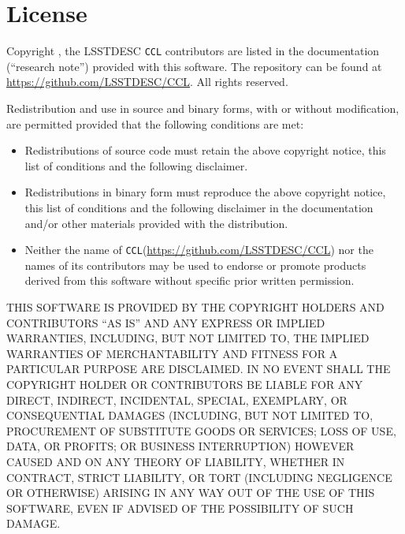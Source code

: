 \documentclass[\docopts]{\docclass}
\newcommand{\ccl}{{\tt CCL}\xspace}
\begin{document}
\section{License}
\label{sec:license}

Copyright , the LSSTDESC \ccl contributors are listed in the
documentation (``research note'') provided with this software. The repository can be found at \url{https://github.com/LSSTDESC/CCL}. All rights reserved.

Redistribution and use in source and binary forms, with or without
modification, are permitted provided that the following conditions are met:

\begin{itemize}
\item Redistributions of source code must retain the above copyright notice, this
  list of conditions and the following disclaimer.
\item Redistributions in binary form must reproduce the above copyright notice,
  this list of conditions and the following disclaimer in the documentation
  and/or other materials provided with the distribution.
\item Neither the name of \ccl (\url{https://github.com/LSSTDESC/CCL}) nor the names of its
  contributors may be used to endorse or promote products derived from
  this software without specific prior written permission.
\end{itemize}

THIS SOFTWARE IS PROVIDED BY THE COPYRIGHT HOLDERS AND CONTRIBUTORS ``AS IS''
AND ANY EXPRESS OR IMPLIED WARRANTIES, INCLUDING, BUT NOT LIMITED TO, THE
IMPLIED WARRANTIES OF MERCHANTABILITY AND FITNESS FOR A PARTICULAR PURPOSE ARE
DISCLAIMED. IN NO EVENT SHALL THE COPYRIGHT HOLDER OR CONTRIBUTORS BE LIABLE
FOR ANY DIRECT, INDIRECT, INCIDENTAL, SPECIAL, EXEMPLARY, OR CONSEQUENTIAL
DAMAGES (INCLUDING, BUT NOT LIMITED TO, PROCUREMENT OF SUBSTITUTE GOODS OR
SERVICES; LOSS OF USE, DATA, OR PROFITS; OR BUSINESS INTERRUPTION) HOWEVER
CAUSED AND ON ANY THEORY OF LIABILITY, WHETHER IN CONTRACT, STRICT LIABILITY,
OR TORT (INCLUDING NEGLIGENCE OR OTHERWISE) ARISING IN ANY WAY OUT OF THE USE
OF THIS SOFTWARE, EVEN IF ADVISED OF THE POSSIBILITY OF SUCH DAMAGE.







\end{document}

